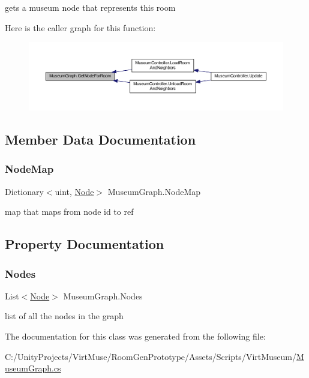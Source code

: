 gets a museum node that represents this room 

Here is the caller graph for this function\+:
\nopagebreak
\begin{figure}[H]
\begin{center}
\leavevmode
\includegraphics[width=350pt]{class_museum_graph_a82509a5eb8dd2020aaee17261bedb974_icgraph}
\end{center}
\end{figure}


\subsection{Member Data Documentation}
\mbox{\label{class_museum_graph_a79484680da9ead2da6cca2a8225458e5}} 
\subsubsection{\texorpdfstring{Node\+Map}{NodeMap}}
{\footnotesize\ttfamily Dictionary$<$uint, \mbox{\hyperlink{class_museum_graph_1_1_node}{Node}}$>$ Museum\+Graph.\+Node\+Map\hspace{0.3cm}{\ttfamily [private]}}



map that maps from node id to ref 



\subsection{Property Documentation}
\mbox{\label{class_museum_graph_aa166ad4620069c3aaa4b87fd3ae4bfd7}} 
\subsubsection{\texorpdfstring{Nodes}{Nodes}}
{\footnotesize\ttfamily List$<$\mbox{\hyperlink{class_museum_graph_1_1_node}{Node}}$>$ Museum\+Graph.\+Nodes\hspace{0.3cm}{\ttfamily [get]}}



list of all the nodes in the graph 



The documentation for this class was generated from the following file\+:\begin{DoxyCompactItemize}
\item 
C\+:/\+Unity\+Projects/\+Virt\+Muse/\+Room\+Gen\+Prototype/\+Assets/\+Scripts/\+Virt\+Museum/\mbox{\hyperlink{_museum_graph_8cs}{Museum\+Graph.\+cs}}\end{DoxyCompactItemize}
